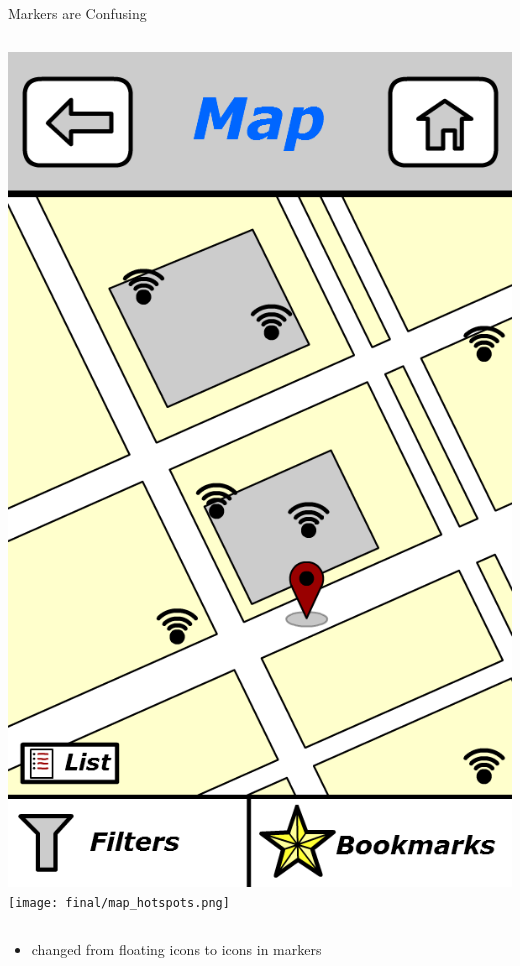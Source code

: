 \documentclass{beamer}
\begin{document}
\begin{frame}{Markers are Confusing}
    \begin{columns}[c]
        \center\includegraphics[height=0.5 \textheight]{digital/map_hotspots.png}
        \center\texttt{[image: final/map\_hotspots.png]}
    \end{columns}
    \begin{itemize}
        \item changed from floating icons to icons in markers
    \end{itemize}
\end{frame}
\end{document}
